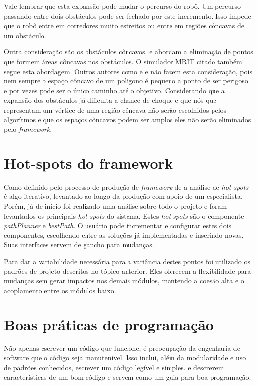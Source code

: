 Vale lembrar que esta expansão pode mudar o percurso do robô. Um percurso passando entre dois obstáculos pode ser fechado por este incremento. Isso impede que o robô entre em corredores muito estreitos ou entre em regiões côncavas de um obstáculo.

Outra consideração são os obstáculos côncavos. \cite{Siegwart2004} e \cite{Guzman2008} abordam a eliminação de pontos que formem áreas côncavas nos obstáculos. O simulador MRIT citado também segue esta abordagem. Outros autores como \cite{Thomsen2010} e \cite{Choset2005} e  não fazem esta consideração, pois nem sempre o espaço côncavo de um polígono é pequeno a ponto de ser perigoso e por vezes pode ser o único caminho até o objetivo. Considerando que a expansão dos obstáculos já dificulta a chance de choque e que nós que representam um vértice de uma região côncava não serão escolhidos pelos algorítmos e que os espaços côncavos podem ser amplos eles não serão eliminados pelo \textit{framework}.

\section{Hot-spots do framework}

Como definido pelo processo de produção de \textit{framework} de \cite{Fayad1999} a análise de \textit{hot-spots} é algo iterativo, levantado ao longo da produção com apoio de um especialista. Porém, já de início foi realizado uma análise sobre todo o projeto e foram levantados os principais \textit{hot-spots} do sistema. Estes \textit{hot-spots} são o componente \textit{pathPlanner} e \textit{bestPath}. O usuário pode incrementar e configurar estes dois componentes, escolhendo entre as soluções já implementadas e inserindo novas. Suas interfaces servem de gancho para mudanças.

Para dar a variabilidade necessária para a variância destes pontos foi utilizado os padrões de projeto descritos no tópico anterior. Eles oferecem a flexibilidade para mudanças sem gerar impactos nos demais módulos, mantendo a coesão alta e o acoplamento entre os módulos baixo.

\section{Boas práticas de programação}

Não apenas escrever um código que funcione, é preocupação da engenharia de software que o código seja manutenível. Isso inclui, além da modularidade e uso de padrões conhecidos, escrever um código legível e simples. \cite{Goodliffe2007} e \cite{McConnel2004} descrevem características de um bom código e servem como um guia para boa programação.


